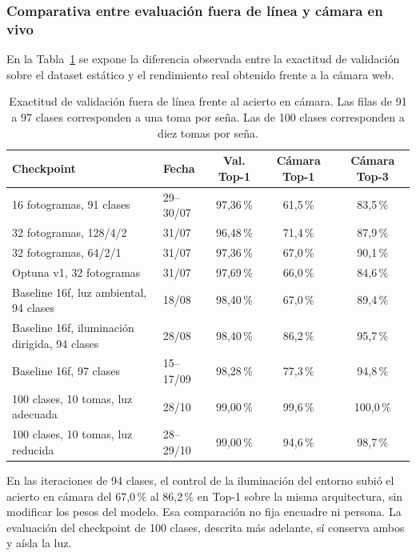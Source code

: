\subsubsection{Comparativa entre evaluación fuera de línea y cámara en vivo}
En la Tabla~\ref{tab:brecha_offline_camara} se expone la diferencia observada entre la exactitud de validación sobre el dataset estático y el rendimiento real obtenido frente a la cámara web.

\begin{table}[H]
    \centering
    \small
    \caption{Exactitud de validación fuera de línea frente al acierto en cámara. Las filas de 91 a 97 clases corresponden a una toma por seña. Las de 100 clases corresponden a diez tomas por seña.}
    \label{tab:brecha_offline_camara}
    \begin{tabular}{llccc}
        \toprule
        \textbf{Checkpoint} & \textbf{Fecha} & \textbf{Val. Top-1} & \textbf{Cámara Top-1} & \textbf{Cámara Top-3} \\
        \midrule
        16 fotogramas, 91 clases & 29--30/07 & 97{,}36\,\% & 61{,}5\,\% & 83{,}5\,\% \\
        32 fotogramas, 128/4/2 & 31/07 & 96{,}48\,\% & 71{,}4\,\% & 87{,}9\,\% \\
        32 fotogramas, 64/2/1 & 31/07 & 97{,}36\,\% & 67{,}0\,\% & 90{,}1\,\% \\
        Optuna v1, 32 fotogramas & 31/07 & 97{,}69\,\% & 66{,}0\,\% & 84{,}6\,\% \\
        Baseline 16f, luz ambiental, 94 clases & 18/08 & 98{,}40\,\% & 67{,}0\,\% & 89{,}4\,\% \\
        Baseline 16f, iluminación dirigida, 94 clases & 28/08 & 98{,}40\,\% & 86{,}2\,\% & 95{,}7\,\% \\
        Baseline 16f, 97 clases & 15--17/09 & 98{,}28\,\% & 77{,}3\,\% & 94{,}8\,\% \\
        100 clases, 10 tomas, luz adecuada & 28/10 & 99{,}00\,\% & 99{,}6\,\% & 100{,}0\,\% \\
        100 clases, 10 tomas, luz reducida & 28--29/10 & 99{,}00\,\% & 94{,}6\,\% & 98{,}7\,\% \\
        \bottomrule
    \end{tabular}
\end{table}

En las iteraciones de 94 clases, el control de la iluminación del entorno subió el acierto en cámara del 67{,}0\,\% al 86{,}2\,\% en Top-1 sobre la misma arquitectura, sin modificar los pesos del modelo. Esa comparación no fija encuadre ni persona. La evaluación del checkpoint de 100 clases, descrita más adelante, sí conserva ambos y aísla la luz.

